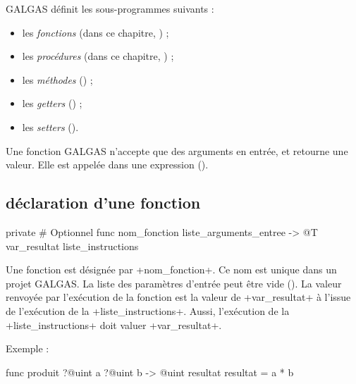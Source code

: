 

GALGAS définit les sous-programmes suivants :
\begin{itemize}
  \item les \emph{fonctions} (dans ce chapitre, ) ;
  \item les \emph{procédures} (dans ce chapitre, ) ;
  \item les \emph{méthodes} () ;
  \item les \emph{getters} () ;
  \item les \emph{setters} ().
\end{itemize}


Une fonction GALGAS n'accepte que des arguments en entrée, et retourne une valeur. Elle est appelée dans une expression ().

\subsection{déclaration d'une fonction}

\begin{galgas}
private # Optionnel
func nom_fonction liste_arguments_entree -> @T var_resultat {
  liste_instructions
}
\end{galgas}

Une fonction est désignée par \ggs+nom_fonction+. Ce nom est unique dans un projet GALGAS. La liste des paramètres d'entrée peut être vide (). La valeur renvoyée par l'exécution de la fonction est la valeur de \ggs+var_resultat+ à l'issue de l'exécution de la \ggs+liste_instructions+. Aussi, l'exécution de la \ggs+liste_instructions+ doit valuer \ggs+var_resultat+.

Exemple :

\begin{galgas}
func produit ?@uint a ?@uint b -> @uint resultat {
  resultat = a * b
}
\end{galgas}

